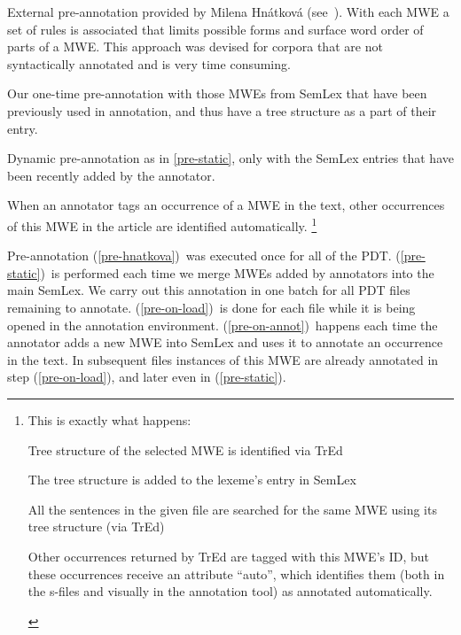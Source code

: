 \begin{asparaenum}[A)]
\item \label{pre-hnatkova}External pre-annotation provided by Milena Hnátková (see~\citealp{hnatkova:2002}). With each MWE a set of rules is associated that limits possible forms and surface word order of parts of a MWE. This approach was devised for corpora that are not syntactically annotated and is very time consuming.
\item \label{pre-static}Our one-time pre-annotation with those MWEs from SemLex that have been previously used in annotation, and thus have a tree structure as a part of their entry.
\item \label{pre-on-load}Dynamic pre-annotation as in \ref{pre-static}, only with the SemLex entries that have been recently added by the annotator. 
\item \label{pre-on-annot}When an annotator tags an occurrence of a MWE in the text, other occurrences of this MWE in the article are identified automatically.%
%
\footnote{This is exactly what happens:
\begin{inparaenum}[1)]
\item Tree structure of the selected MWE is identified via TrEd
\item The tree structure is added to the lexeme's entry in SemLex
\item All the sentences in the given file are searched for the same MWE using its tree structure (via TrEd)
\item Other occurrences returned by TrEd are tagged with this MWE's ID, but these occurrences receive an attribute ``auto'', which identifies them (both in the s-files and visually in the annotation tool) as annotated automatically.
\end{inparaenum}
} %
\end{asparaenum}

Pre-annotation (\ref{pre-hnatkova})~was executed once for all of the PDT. (\ref{pre-static})~is performed each time we merge MWEs added by annotators into the main SemLex. We carry out this annotation in one batch for all PDT files remaining to annotate. (\ref{pre-on-load})~is done for each file while it is being opened in the annotation environment. 
(\ref{pre-on-annot})~happens each time the annotator adds a new MWE into SemLex and uses it to annotate an occurrence in the text. In subsequent files instances of this MWE are already annotated in step (\ref{pre-on-load}), and later even in (\ref{pre-static}).
 
